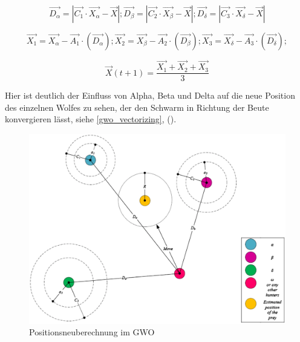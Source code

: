 \begin{equation}
    \vec{D_\alpha} = |\vec{C_1} \cdot \vec{X_\alpha} - \vec{X}|;
    \vec{D_\beta} = |\vec{C_2} \cdot \vec{X_\beta} - \vec{X}|;
    \vec{D_\delta} = |\vec{C_3} \cdot \vec{X_\delta} - \vec{X}|
    \label{calcD_abc}
\end{equation}

\begin{equation}
    \vec{X_1} = \vec{X_\alpha} - \vec{A_1} \cdot (\vec{D_\alpha});
    \vec{X_2} = \vec{X_\beta} - \vec{A_2} \cdot (\vec{D_\beta});
    \vec{X_3} = \vec{X_\delta} - \vec{A_3} \cdot (\vec{D_\delta});
    \label{calcX_123}
\end{equation}

\begin{equation}
    \vec{X}(t+1) = \frac{\vec{X_1} + \vec{X_2} + \vec{X_3}}{3}
    \label{calcNextP2}
\end{equation}

Hier ist deutlich der Einfluss von Alpha, Beta und Delta auf die neue Position des einzelnen Wolfes zu sehen, der den Schwarm in Richtung der Beute konvergieren lässt, siehe \autoref{gwo_vectorizing}, (\cite[vgl. Mirjalili 2014, S.7]{MIRJALILI201446}).

\begin{figure}[ht]
    \begin{center}
        \includegraphics[width=1.0\textwidth]{assets/img/tgis12517-fig-0002-m.png}
        \caption[Positionsneuberechnung im GWO]{Positionsneuberechnung im GWO \cite{MIRJALILI201446}}
        \label{gwo_vectorizing}
    \end{center}
\end{figure}

